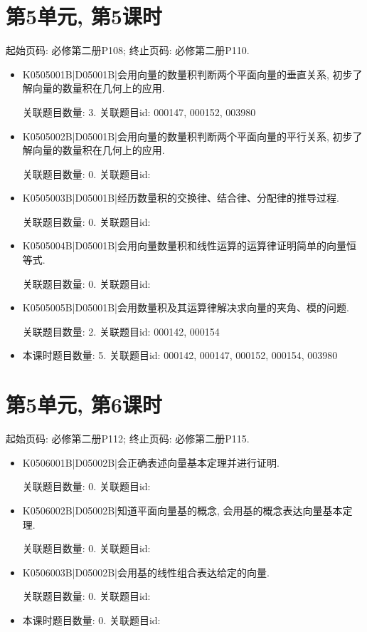 \section*{第5单元, 第5课时}
起始页码: 必修第二册P108; 终止页码: 必修第二册P110.
\begin{itemize}
\item K0505001B|D05001B|会用向量的数量积判断两个平面向量的垂直关系, 初步了解向量的数量积在几何上的应用.

关联题目数量: 3. 关联题目id: 000147, 000152, 003980

\item K0505002B|D05001B|会用向量的数量积判断两个平面向量的平行关系, 初步了解向量的数量积在几何上的应用.

关联题目数量: 0. 关联题目id: 

\item K0505003B|D05001B|经历数量积的交换律、结合律、分配律的推导过程.

关联题目数量: 0. 关联题目id: 

\item K0505004B|D05001B|会用向量数量积和线性运算的运算律证明简单的向量恒等式.

关联题目数量: 0. 关联题目id: 

\item K0505005B|D05001B|会用数量积及其运算律解决求向量的夹角、模的问题.

关联题目数量: 2. 关联题目id: 000142, 000154

\item 本课时题目数量: 5. 关联题目id: 000142, 000147, 000152, 000154, 003980

\end{itemize}

\section*{第5单元, 第6课时}
起始页码: 必修第二册P112; 终止页码: 必修第二册P115.
\begin{itemize}
\item K0506001B|D05002B|会正确表述向量基本定理并进行证明.

关联题目数量: 0. 关联题目id: 

\item K0506002B|D05002B|知道平面向量基的概念, 会用基的概念表达向量基本定理.

关联题目数量: 0. 关联题目id: 

\item K0506003B|D05002B|会用基的线性组合表达给定的向量.

关联题目数量: 0. 关联题目id: 

\item 本课时题目数量: 0. 关联题目id: 

\end{itemize}

